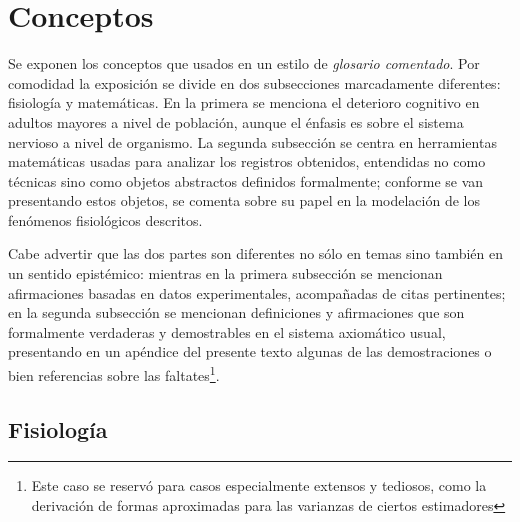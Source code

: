 
\section{Conceptos}

Se exponen los conceptos que usados en un estilo
de \textit{glosario comentado}.
Por comodidad la exposici\'on se divide en dos subsecciones marcadamente diferentes: fisiolog\'ia y 
matem\'aticas.
En la primera se menciona el deterioro cognitivo en adultos mayores
a nivel de poblaci\'on, aunque el énfasis es sobre el sistema nervioso a nivel de organismo.
La segunda subsecci\'on se centra en herramientas matemáticas usadas
para analizar los registros obtenidos, entendidas no como técnicas sino como objetos abstractos
definidos formalmente; 
conforme se van presentando estos objetos, se comenta sobre su papel en la modelación de los
fenómenos fisiológicos descritos.

Cabe advertir que las dos partes son diferentes no s\'olo en temas sino
tambi\'en en un sentido epist\'emico: mientras en la primera subsecci\'on se mencionan afirmaciones
basadas en datos experimentales, acompa\~nadas de citas pertinentes; en la segunda subsecci\'on
se mencionan definiciones y afirmaciones que son formalmente verdaderas y demostrables en el sistema 
axiomático usual, presentando en un apéndice del presente texto algunas de las demostraciones 
o bien referencias sobre las faltates\footnote{Este caso se reservó para casos especialmente 
extensos y tediosos, como la derivación de formas aproximadas para las varianzas de ciertos 
estimadores}.


%

\subsection{Fisiolog\'ia}


